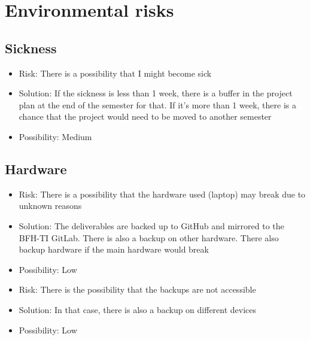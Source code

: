 \documentclass[
	a4paper               %
	,BCOR=0mm            %
	,bibliography=totoc   %
	,listof=totoc         %
	,monolingual
	,twoside=false
]{bfhthesis}              %
\begin{document}
\section{Environmental risks}

\subsection{Sickness}
\begin{itemize}
	\item Risk: There is a possibility that I might become sick
	\item Solution: If the sickness is less than 1 week, there is a buffer in the project plan at the end of the semester for that. If it's more than 1 week, there is a chance that the project would need to be moved to another semester
	\item Possibility: Medium
\end{itemize}

\subsection{Hardware}
\begin{itemize}
	\item Risk: There is a possibility that the hardware used (laptop) may break due to unknown reasons
	\item Solution: The deliverables are backed up to GitHub and mirrored to the BFH-TI GitLab. There is also a backup on other hardware. There also backup hardware if the main hardware would break
	\item Possibility: Low
\end{itemize}
\begin{itemize}
	\item Risk: There is the possibility that the backups are not accessible
	\item Solution: In that case, there is also a backup on different devices
	\item Possibility: Low
\end{itemize}
\end{document}
